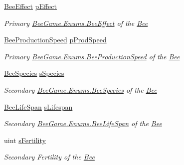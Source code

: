 \begin{DoxyCompactItemize}
\hyperlink{namespace_bee_game_1_1_enums_acf7ae32a86385a40fc0c7b55af95c6c3}{Bee\+Effect} \hyperlink{struct_bee_game_1_1_bee_1_1_bee_data_a652a963fb73f2a096a001d817c0ef2be}{p\+Effect}
\begin{DoxyCompactList}\small\item\em Primary \hyperlink{namespace_bee_game_1_1_enums_acf7ae32a86385a40fc0c7b55af95c6c3}{Bee\+Game.\+Enums.\+Bee\+Effect} of the \hyperlink{namespace_bee_game_1_1_bee}{Bee} \end{DoxyCompactList}\item 
\hyperlink{namespace_bee_game_1_1_enums_afee18200a21cc4b8e1d0cdb669930f14}{Bee\+Production\+Speed} \hyperlink{struct_bee_game_1_1_bee_1_1_bee_data_a8fa39d271a23500ad826041b46d9feaf}{p\+Prod\+Speed}
\begin{DoxyCompactList}\small\item\em Primary \hyperlink{namespace_bee_game_1_1_enums_afee18200a21cc4b8e1d0cdb669930f14}{Bee\+Game.\+Enums.\+Bee\+Production\+Speed} of the \hyperlink{namespace_bee_game_1_1_bee}{Bee} \end{DoxyCompactList}\item 
\hyperlink{namespace_bee_game_1_1_enums_aa2ead984825678d83c42d48f6382619c}{Bee\+Species} \hyperlink{struct_bee_game_1_1_bee_1_1_bee_data_add33b8a3084a342ad7176a9366c2fc55}{s\+Species}
\begin{DoxyCompactList}\small\item\em Secondary \hyperlink{namespace_bee_game_1_1_enums_aa2ead984825678d83c42d48f6382619c}{Bee\+Game.\+Enums.\+Bee\+Species} of the \hyperlink{namespace_bee_game_1_1_bee}{Bee} \end{DoxyCompactList}\item 
\hyperlink{namespace_bee_game_1_1_enums_ae3853807ded2f4d99a0d4a7fb4b2bc46}{Bee\+Life\+Span} \hyperlink{struct_bee_game_1_1_bee_1_1_bee_data_af5c384db9813e463bb0d66cb8b443d87}{s\+Lifespan}
\begin{DoxyCompactList}\small\item\em Secondary \hyperlink{namespace_bee_game_1_1_enums_ae3853807ded2f4d99a0d4a7fb4b2bc46}{Bee\+Game.\+Enums.\+Bee\+Life\+Span} of the \hyperlink{namespace_bee_game_1_1_bee}{Bee} \end{DoxyCompactList}\item 
uint \hyperlink{struct_bee_game_1_1_bee_1_1_bee_data_a20a4084334bbbba3942f67622596b596}{s\+Fertility}
\begin{DoxyCompactList}\small\item\em Secondary Fertility of the \hyperlink{namespace_bee_game_1_1_bee}{Bee} \end{DoxyCompactList}\item 

\end{DoxyCompactItemize}
